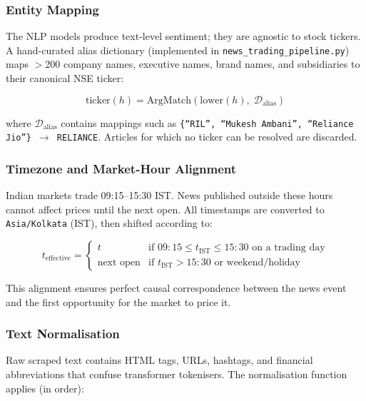 \documentclass[12pt, a4paper]{article}
\begin{document}
\subsubsection{Entity Mapping}

The NLP models produce text-level sentiment; they are agnostic to stock tickers. A hand-curated alias dictionary (implemented in \texttt{news\_trading\_pipeline.py}) maps $>$200 company names, executive names, brand names, and subsidiaries to their canonical NSE ticker:

\begin{equation}
    \text{ticker}(h) = \text{ArgMatch}\!\left(\text{lower}(h),\; \mathcal{D}_{\text{alias}}\right)
\end{equation}

where $\mathcal{D}_{\text{alias}}$ contains mappings such as \texttt{\{``RIL'', ``Mukesh Ambani'', ``Reliance Jio''\} $\to$ RELIANCE}. Articles for which no ticker can be resolved are discarded.

\subsubsection{Timezone and Market-Hour Alignment}

Indian markets trade 09:15--15:30 IST. News published outside these hours cannot affect prices until the next open. All timestamps are converted to \texttt{Asia/Kolkata} (IST), then shifted according to:

\begin{equation}
    t_{\text{effective}} = \begin{cases}
        t                  & \text{if } 09{:}15 \leq t_{\text{IST}} \leq 15{:}30 \text{ on a trading day} \\
        \text{next open}   & \text{if } t_{\text{IST}} > 15{:}30 \text{ or weekend/holiday}
    \end{cases}
\end{equation}

This alignment ensures perfect causal correspondence between the news event and the first opportunity for the market to price it.

\subsubsection{Text Normalisation}

Raw scraped text contains HTML tags, URLs, hashtags, and financial abbreviations that confuse transformer tokenisers. The normalisation function applies (in order):
\end{document}
